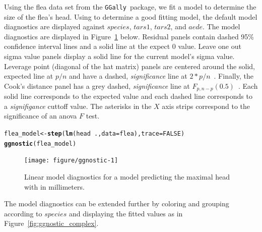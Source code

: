 \documentclass[stat,dissertation]{puthesis}\usepackage[]{graphicx}\usepackage{xcolor}
\makeatletter
\newcommand{\hlnum}[1]{\textcolor[rgb]{0.686,0.059,0.569}{#1}}%
\newcommand{\hlopt}[1]{\textcolor[rgb]{0,0,0}{#1}}%
\newcommand{\hlstd}[1]{\textcolor[rgb]{0.345,0.345,0.345}{#1}}%
\newcommand{\hlkwb}[1]{\textcolor[rgb]{0.69,0.353,0.396}{#1}}%
\newcommand{\hlkwc}[1]{\textcolor[rgb]{0.333,0.667,0.333}{#1}}%
\newcommand{\hlkwd}[1]{\textcolor[rgb]{0.737,0.353,0.396}{\textbf{#1}}}%
\newenvironment{kframe}{%
 \def\at@end@of@kframe{}%
 \ifinner\ifhmode%
  \def\at@end@of@kframe{\end{minipage}}%
  \begin{minipage}{\columnwidth}%
 \fi\fi%
 \def\FrameCommand##1{\hskip\@totalleftmargin \hskip-\fboxsep
 \colorbox{shadecolor}{##1}\hskip-\fboxsep
     \hskip-\linewidth \hskip-\@totalleftmargin \hskip\columnwidth}%
 \MakeFramed {\advance\hsize-\width
   \@totalleftmargin\z@ \linewidth\hsize
   \@setminipage}}%
 {\par\unskip\endMakeFramed%
 \at@end@of@kframe}
\newenvironment{knitrout}{}{} %
\renewenvironment{knitrout}{\setstretch{1}}{}
\newcommand{\pkg}[1]{\texttt{#1}}
\newcommand{\GGally}{\pkg{GGally}}
\makeatother
\begin{document}
Using the flea data set from the \GGally~package, we fit a model to determine the size of the flea's head.  Using  to determine a good fitting model, the default model diagnostics are displayed against $species$, $tars1$, $tars2$, and $aede$.  The model diagnostics are displayed in Figure~\ref{fig:ggnostic} below. Residual panels contain dashed 95\% confidence interval lines and a solid line at the expect 0 value. Leave one out sigma value panels display a solid line for the current model's sigma value. Leverage point (diagonal of the hat matrix) panels are centered around the solid, expected line at $p / n$ and have a dashed, \emph{significance} line at $2 * p / n$~\cite{kutner_linear_models}. Finally, the Cook's distance panel has a grey dashed, \emph{significance} line at $F_{p, n - p}(0.5)$~\cite{kutner_linear_models}. Each solid line corresponds to the expected value and each dashed line corresponds to a \emph{signifigance} cuttoff value. The asterisks in the $X$ axis strips correspond to the significance of an anova $F$ test.

\newpage
\begin{knitrout}\small
{}\color{fgcolor}\begin{kframe}
\begin{alltt}
\hlstd{flea_model} \hlkwb{<-} \hlkwd{step}\hlstd{(}\hlkwd{lm}\hlstd{(head} \hlopt{~} \hlstd{.,} \hlkwc{data} \hlstd{= flea),} \hlkwc{trace} \hlstd{=} \hlnum{FALSE}\hlstd{)}
\hlkwd{ggnostic}\hlstd{(flea_model)}
\end{alltt}
\end{kframe}\begin{figure}[H]

{\centering \texttt{[image: figure/ggnostic-1]} 

}

\caption{Linear model diagnostics for a model predicting the maximal head with in millimeters.}\label{fig:ggnostic}
\end{figure}


\end{knitrout}

The model diagnostics can be extended further by coloring and grouping according to $species$ and displaying the fitted values as in Figure~\ref{fig:ggnostic_complex}.
\end{document}
